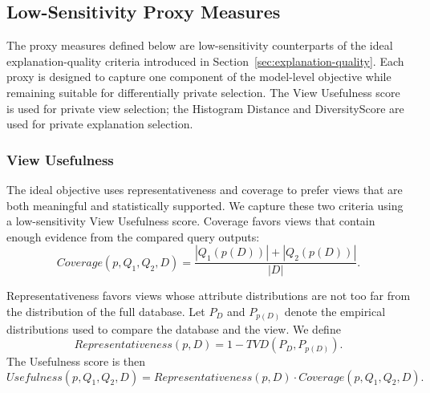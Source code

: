 \subsection{Low-Sensitivity Proxy Measures}
\label{subsec:proxy-measures}

The proxy measures defined below are low-sensitivity counterparts of the ideal explanation-quality criteria introduced in Section~\ref{sec:explanation-quality}.
Each proxy is designed to capture one component of the model-level objective while remaining suitable for differentially private selection.
The View Usefulness score is used for private view selection; the Histogram Distance and DiversityScore are used for private explanation selection.

\subsubsection{View Usefulness}
\label{subsubsec:view-usefulness}

The ideal objective uses representativeness and coverage to prefer views that are both meaningful and statistically supported.
We capture these two criteria using a low-sensitivity View Usefulness score.
Coverage favors views that contain enough evidence from the compared query outputs:
\begin{equation}
Coverage(p,Q_1,Q_2,D)
=
\frac{|Q_1(p(D))|+|Q_2(p(D))|}{|D|}.
\label{eq:coverage-proxy}
\end{equation}

Representativeness favors views whose attribute distributions are not too far from the distribution of the full database.
Let $P_D$ and $P_{p(D)}$ denote the empirical distributions used to compare the database and the view.
We define
\begin{equation}
Representativeness(p,D)
=
1-TVD(P_D,P_{p(D)}).
\label{eq:representativeness-proxy}
\end{equation}
The Usefulness score is then
\begin{equation}
Usefulness(p,Q_1,Q_2,D)
=
Representativeness(p,D) \cdot Coverage(p,Q_1,Q_2,D).
\label{eq:usefulness-proxy}
\end{equation}

